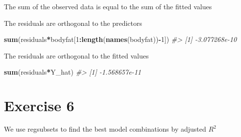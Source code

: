 \documentclass[]{article}
\newenvironment{Shaded}{\begin{snugshade}}{\end{snugshade}}
\newcommand{\CommentTok}[1]{\textcolor[rgb]{0.56,0.35,0.01}{\textit{#1}}}
\newcommand{\DecValTok}[1]{\textcolor[rgb]{0.00,0.00,0.81}{#1}}
\newcommand{\KeywordTok}[1]{\textcolor[rgb]{0.13,0.29,0.53}{\textbf{#1}}}
\newcommand{\NormalTok}[1]{#1}
\newcommand{\OperatorTok}[1]{\textcolor[rgb]{0.81,0.36,0.00}{\textbf{#1}}}
\newcommand{\StringTok}[1]{\textcolor[rgb]{0.31,0.60,0.02}{#1}}
\begin{document}
The sum of the observed data is equal to the sum of the fitted values

\begin{Shaded}
\end{Shaded}

The residuals are orthogonal to the predictors

\begin{Shaded}
\begin{Highlighting}[]
\KeywordTok{sum}\NormalTok{(residuals}\OperatorTok{*}\NormalTok{bodyfat[}\DecValTok{1}\OperatorTok{:}\KeywordTok{length}\NormalTok{(}\KeywordTok{names}\NormalTok{(bodyfat))}\OperatorTok{-}\DecValTok{1}\NormalTok{])}
\CommentTok{#> [1] -3.077268e-10}
\end{Highlighting}
\end{Shaded}

The residuals are orthogonal to the fitted values

\begin{Shaded}
\begin{Highlighting}[]
\KeywordTok{sum}\NormalTok{(residuals}\OperatorTok{*}\NormalTok{Y_hat)}
\CommentTok{#> [1] -1.568657e-11}
\end{Highlighting}
\end{Shaded}

\newpage

\hypertarget{exercise-6}{%
\section{Exercise 6}\label{exercise-6}}

We use regsubsets to find the best model combinations by adjusted
\(R^{2}\)
\end{document}
